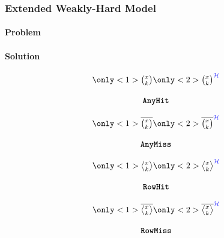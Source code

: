 \begin{frame}
    \frametitle{Extended Weakly-Hard Model}
    \framesubtitle<1>{Problem}%
    \framesubtitle<2>{Solution}%
    \begin{minipage}[c]{0.23\textwidth}
        \centering
        \begin{equation*}
            \begin{matrix}
                \only<1>{\Large \anyhit{}}%
                \only<2>{\Large \anyhit{}^{\textcolor{hicolour}{\strat}}}\\
                            \\
                \tAH{}
            \end{matrix}
        \end{equation*}\newline
    \end{minipage}\hfill
    \begin{minipage}[c]{0.23\textwidth}
        \centering
        \begin{equation*}
            \begin{matrix}
                \only<1>{\Large \anymiss{}}%
                \only<2>{\Large \anymiss{}^{\textcolor{hicolour}{\strat}}}\\
                            \\
                \tAM{}
            \end{matrix}
        \end{equation*}\newline
    \end{minipage}\hfill
    \begin{minipage}[c]{0.23\textwidth}
        \centering
        \begin{equation*}
            \begin{matrix}
                \only<1>{\Large \rowhit{}}%
                \only<2>{\Large \rowhit{}^{\textcolor{hicolour}{\strat}}}\\
                            \\
                \tRH{}
            \end{matrix}
        \end{equation*}\newline
    \end{minipage}\hfill
    \begin{minipage}[c]{0.23\textwidth}
        \centering
        \begin{equation*}
            \begin{matrix}
                \only<1>{\Large \rowmiss{}}%
                \only<2>{\Large \rowmiss{}^{\textcolor{hicolour}{\strat}}}\\
                            \\
                \tRM{}
            \end{matrix}
        \end{equation*}\newline
    \end{minipage}

    \centering
\end{frame}


